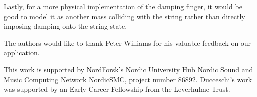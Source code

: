 \documentclass[dvipsnames, pdftex]{article}
\begin{document}
Lastly, for a more physical implementation of the damping finger, it would be good to model it as another mass colliding with the string rather than directly imposing damping onto the string state.

\begin{acknowledgments}
The authors would like to thank Peter Williams for his valuable feedback on our application.

This work is supported by NordForsk's Nordic
University Hub Nordic Sound and Music Computing Network
NordicSMC, project number 86892. Ducceschi's work was supported by an Early Career Fellowship from the Leverhulme Trust.
\end{acknowledgments} 

{%

}
\end{document}

